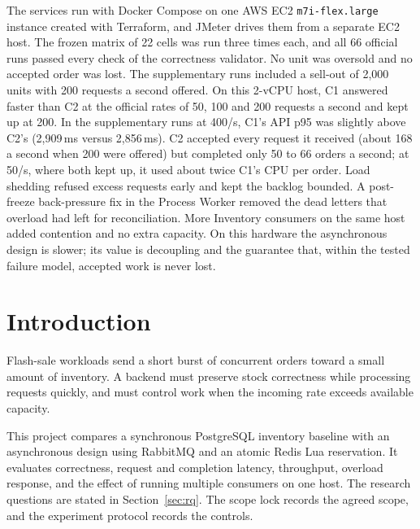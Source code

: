 \documentclass[a4paper]{report}
\begin{document}
The services run with Docker Compose on one AWS EC2 \texttt{m7i-flex.large}
instance created with Terraform, and JMeter drives them from a separate EC2
host. The frozen matrix of 22 cells was run three times each, and all 66
official runs passed every check of the correctness validator. No unit was
oversold and no accepted order was lost. The supplementary runs included a
sell-out of 2,000 units with 200 requests a second offered. On this 2-vCPU
host, C1 answered faster than C2 at the official rates of 50, 100 and 200
requests a second and kept up at 200. In the supplementary runs at 400/s, C1's
API p95 was slightly above C2's (2,909\,ms versus 2,856\,ms). C2 accepted every
request it received (about 168 a second when 200 were offered) but completed
only 50 to 66 orders a second; at 50/s, where both kept up, it used about
twice C1's CPU per order. Load shedding refused excess requests early and
kept the backlog bounded. A post-freeze back-pressure fix in the Process
Worker removed the dead letters
that overload had left for reconciliation. More Inventory consumers on the same
host added contention and no extra capacity. On this hardware the asynchronous
design is slower; its value is decoupling and the guarantee that, within the
tested failure model, accepted work is never lost.

\tableofcontents
\listoffigures
\listoftables

\clearpage
{}

\chapter{Introduction}

Flash-sale workloads send a short burst of concurrent orders toward a small amount
of inventory. A backend must preserve stock correctness while processing requests
quickly, and must control work when the incoming rate exceeds available capacity.

This project compares a synchronous PostgreSQL inventory baseline with an
asynchronous design using RabbitMQ and an atomic Redis Lua reservation. It evaluates
correctness, request and completion latency, throughput, overload response, and the
effect of running multiple consumers on one host. The research questions are
stated in Section~\ref{sec:rq}. The scope lock records the agreed scope,
and the experiment protocol records the controls.
\end{document}
